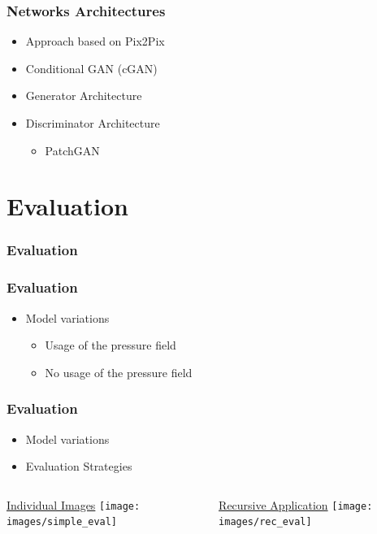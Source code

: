 \documentclass[18pt]{beamer}
\begin{document}
\begin{frame}[t]
  \frametitle{Networks Architectures}
  \begin{itemize}
  \item Approach based on Pix2Pix
  \item Conditional GAN (cGAN)
  \item Generator Architecture
  \item Discriminator Architecture
    \begin{itemize}
    \item PatchGAN
    \end{itemize}
  \end{itemize}
  
\end{frame}

\section{Evaluation}

\begin{frame}[t]
  \frametitle{Evaluation}
\end{frame}

\begin{frame}[t]
  \frametitle{Evaluation}
  \begin{itemize}
  \item Model variations
    \begin{itemize}
    \item Usage of the pressure field
    \item No usage of the pressure field
    \end{itemize}
  \end{itemize}
\end{frame}

\begin{frame}[t]
  \frametitle{Evaluation}
  \begin{itemize}
  \item Model variations
  \item Evaluation Strategies
  \end{itemize}

  \vspace{-0.7cm}

  \begin{columns}[t]
    \begin{column}{0.5\textwidth}
      \begin{center}
        {\large \underline{Individual Images}}
        \texttt{[image: images/simple\_eval]}
      \end{center}
    \end{column}
    \begin{column}{0.5\textwidth}
      \begin{center}
        {\large \underline{Recursive Application}}
        \texttt{[image: images/rec\_eval]}
      \end{center}
    \end{column}
  \end{columns}
\end{frame}
\end{document}
